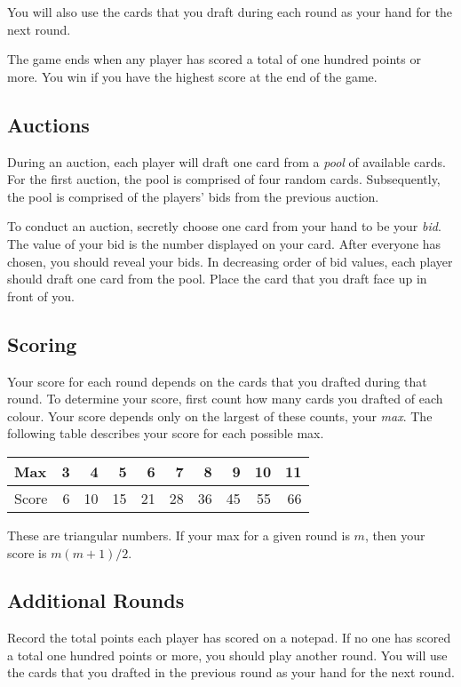 \documentclass[a6paper, parskip=half, DIV=14, 10pt]{scrartcl}
\begin{document}
You will also use the cards that you draft during each round as your hand for the next round.

The game ends when any player has scored a total of one hundred points or more.
You win if you have the highest score at the end of the game.

\vfill

\subsection*{Auctions}
During an auction, each player will draft one card from a \emph{pool} of available cards.
For the first auction, the pool is comprised of four random cards.
Subsequently, the pool is comprised of the players' bids from the previous auction.


To conduct an auction, secretly choose one card from your hand to be your \emph{bid}.
The value of your bid is the number displayed on your card.
After everyone has chosen, you should reveal your bids.
In decreasing order of bid values, each player should draft one card from the pool.
Place the card that you draft face up in front of you.

\newpage

\subsection*{Scoring}
Your score for each round depends on the cards that you drafted during that round.
To determine your score, first count how many cards you drafted of each colour.
Your score depends only on the largest of these counts, your \emph{max}.
The following table describes your score for each possible max.

\medskip

{
\small
\begin{tabular}{l rrrrrrrrr} \toprule
Max & 3 & 4 & 5 & 6 & 7 & 8 & 9 & 10 & 11 \\ \midrule
Score & 6 & 10 & 15 & 21 & 28 & 36 & 45 & 55 & 66 \\
\bottomrule
\end{tabular}
}

\medskip

These are triangular numbers. If your max for a given round is $m$, then your score is $m(m+1)/2$. 

\vfill

\subsection*{Additional Rounds}
Record the total points each player has scored on a notepad. If no one has scored a total one hundred points or more, you should play another round. You will use the cards that you drafted in the previous round as your hand for the next round.
\vfill
\hrulefill
\end{document}
